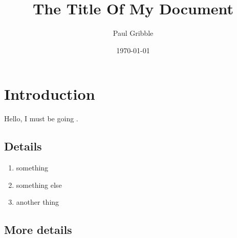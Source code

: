 \documentclass[12pt,letterpaper]{article}
\title{The Title Of My Document}
\author{Paul Gribble}
\date{\today}
\begin{document}
\maketitle

\lipsum[1]

\section{Introduction}

\lipsum[2]

Hello, I must be going \citep{Mattar:2005}.

\lipsum[3-5]

\subsection{Details}

\lipsum[6-7]

\begin{enumerate}
\item something
\item something else
\item another thing
\end{enumerate}

\lipsum[8]

\subsection{More details}

\lipsum[9-13]



\end{document}
